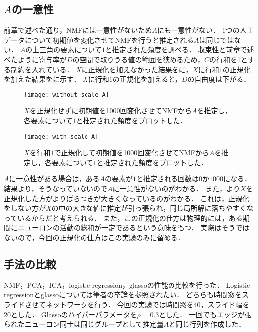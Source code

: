 \subsection{$A$の一意性}
前章で述べた通り，NMFには一意性がないため$A$にも一意性がない．
1つの人工データについて初期値を変化させてNMFを行うと推定される$A$は同じではない．
$A$の上三角の要素について$1$と推定された頻度を調べる．
収束性と前章で述べたように寄与率が$D$の空間で取りうる値の範囲を狭めるため，$C$の行和を1とする制約を入れている．
$X$に正規化を加えなかった結果をに，$X$に行和$1$の正規化を加えた結果をに示す．
$X$に行和$1$の正規化を加えると，$D$の自由度は下がる．

\begin{figure}[htbp]
    \begin{minipage}{0.5\hsize}
			\begin{center}
					\texttt{[image: without\_scale\_A]}
					\caption{$X$を正規化せずに初期値を1000回変化させてNMFから$A$を推定し，各要素について$1$と推定された頻度をプロットした．}
					\label{fig:without_scale_A}
			\end{center}
		\end{minipage}
    \begin{minipage}{0.5\hsize}
			\begin{center}
					\texttt{[image: with\_scale\_A]}
					\caption{$X$を行和$1$で正規化して初期値を1000回変化させてNMFから$A$を推定し，各要素について$1$と推定された頻度をプロットした．}
					\label{fig:with_scale_A}
			\end{center}
		\end{minipage}
\end{figure}

$A$に一意性がある場合は，ある$A$の要素が$1$と推定される回数は$0$か$1000$になる．
結果より，そうなっていないので$A$に一意性がないのがわかる．
また，より$X$を正規化した方がよりばらつきが大きくなっているのがわかる．
これは，正規化をしない方が$X$の中の大きな値に推定が引っ張られ，同じ局所解に落ちやすくなっているからだと考えられる．
また，この正規化の仕方は物理的には，ある期間にニューロンの活動の総和が一定であるという意味をもつ．
実際はそうではないので，今回の正規化の仕方はこの実験のみに留める．

\subsection{手法の比較}
NMF，PCA，ICA，logistic regression，glassoの性能の比較を行った．
Logistic regressionとglassoについては筆者の卒論を参照されたい．
どちらも時間窓をスライドさせてネットワークを行う．
今回の実験では時間窓を40，スライド幅を20とした．
Glassoのハイパーパラメータを$\rho = 0.3$とした．
一回でもエッジが張られたニューロン同士は同じグループとして推定量$A$と同じ行列を作成した．

